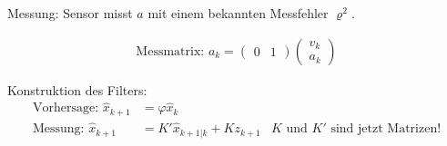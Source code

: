 \documentclass[10pt,a4paper]{scrartcl}
\begin{document}
Messung: Sensor misst $a$ mit einem bekannten Messfehler $\varrho^2$.

\begin{align*}
\text{Messmatrix: } a_k = \left(\begin{matrix}0 & 1\end{matrix}\right) \left( \begin{matrix}v_k \\ a_k\end{matrix} \right)
\end{align*}

Konstruktion des Filters:
\begin{align*}
\text{Vorhersage: } \hat{x}_{k+1} &= \varphi \hat{x}_k \\
\text{Messung: } \hat{x}_{k+1} &= K'\hat{x}_{k+1|k} + K z_{k+1} & K \text{ und } K' \text{ sind jetzt Matrizen!}
\end{align*}
\end{document}
